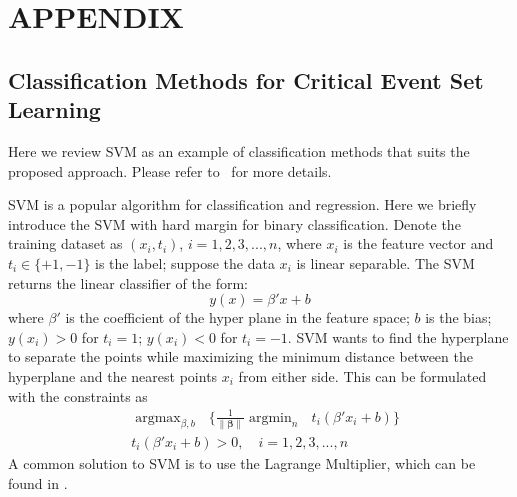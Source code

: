 \documentclass[letterpaper, 10 pt, journal]{IEEEtran}  %
\begin{document}
\addtolength{\textheight}{-12cm}   %







\section*{APPENDIX}
\setcounter{subsection}{0}
\subsection{Classification Methods for Critical Event Set Learning}\label{sec:svm}
Here we review SVM as an example of classification methods that suits the proposed approach. Please refer to~\cite{bishop2006pattern} for more details.

SVM is a popular algorithm for classification and regression. Here we briefly introduce the SVM with hard margin for binary classification. Denote the training dataset as $(x_i,t_i)$, $  i=1,2,3,...,n$, where $x_i$ is the feature vector and $t_i \in \{ +1,-1\}$ is the label; suppose the data ${x_i}$ is linear separable. The SVM returns the linear classifier of the form:
$$ y(x) = \beta'x+b$$
where $\beta'$ is the coefficient of the hyper plane in the feature space; $b$ is the bias; $y(x_i)>0$ for $t_i=1$; $y(x_i)<0$ for $t_i=-1$. 
SVM wants to find the hyperplane to separate the points while maximizing the minimum distance between the hyperplane and the nearest points $x_i$ from either side. This can be formulated with the constraints as 
    \begin{equation*}
    \begin{aligned}
    &\mathop{\arg\max}_{ \beta,b} \text{   }\{\frac{1}{\lVert \mathbf{\beta} \rVert } \mathop{\arg\min}_{n}{\text{   }t_i(\beta'x_i+b)}\}\\
   &t_i(\beta'x_i+b)>0, \quad i = 1,2,3,...,n
    \end{aligned}
    \end{equation*}
A common solution to SVM is to use the Lagrange Multiplier, which can be found in \cite{bishop2006pattern}.
\end{document}

